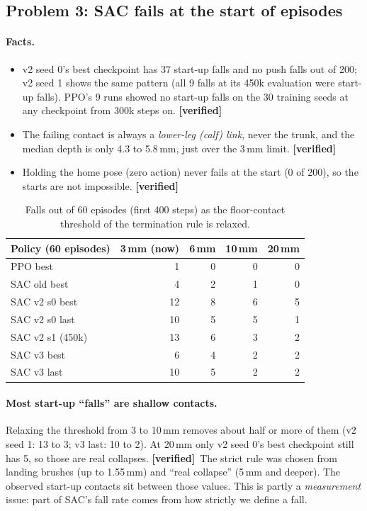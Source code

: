 \documentclass[11pt,a4paper]{article}
\newcommand{\tagv}{\textbf{[verified]}}
\begin{document}
\subsection{Problem 3: SAC fails at the start of episodes}
\paragraph{Facts.}
\begin{itemize}
\item v2 seed 0's best checkpoint has 37 start-up falls and no push falls out of 200; v2 seed 1 shows the same pattern (all 9 falls at its 450k evaluation were start-up falls). PPO's 9 runs showed no start-up falls on the 30 training seeds at any checkpoint from 300k steps on. \tagv
\item The failing contact is always a \emph{lower-leg (calf) link}, never the trunk, and the median depth is only 4.3 to 5.8\,mm, just over the 3\,mm limit. \tagv
\item Holding the home pose (zero action) never fails at the start (0 of 200), so the starts are not impossible. \tagv
\end{itemize}
\begin{table}[H]\centering\small
\begin{tabular}{@{}lrrrr@{}}
\toprule
Policy (60 episodes) & 3\,mm (now) & 6\,mm & 10\,mm & 20\,mm\\\midrule
PPO best & 1 & 0 & 0 & 0\\
SAC old best & 4 & 2 & 1 & 0\\
SAC v2 s0 best & 12 & 8 & 6 & 5\\
SAC v2 s0 last & 10 & 5 & 5 & 1\\
SAC v2 s1 (450k) & 13 & 6 & 3 & 2\\
SAC v3 best & 6 & 4 & 2 & 2\\
SAC v3 last & 10 & 5 & 2 & 2\\\bottomrule
\end{tabular}
\caption{Falls out of 60 episodes (first 400 steps) as the floor-contact threshold of the termination rule is relaxed.}\label{tab:thr}
\end{table}
\paragraph{Most start-up ``falls'' are shallow contacts.} Relaxing the threshold from 3 to 10\,mm removes about half or more of them (v2 seed 1: 13 to 3; v3 last: 10 to 2). At 20\,mm only v2 seed 0's best checkpoint still has 5, so those are real collapses. \tagv\ The strict rule was chosen from landing brushes (up to 1.55\,mm) and ``real collapse'' (5\,mm and deeper). The observed start-up contacts sit between those values. This is partly a \emph{measurement} issue: part of SAC's fall rate comes from how strictly we define a fall.
\end{document}
